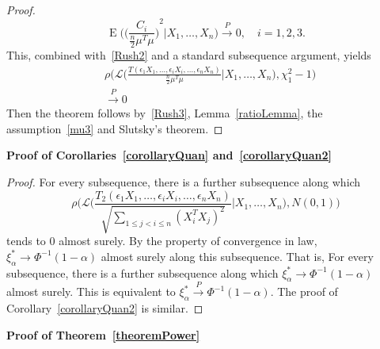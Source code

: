 \documentclass[review]{elsarticle}
\DeclareMathOperator{\myE}{E}
\theoremstyle{plain}
\theoremstyle{definition}
\theoremstyle{remark}
\begin{document}
\begin{proof}
    \begin{equation*}
    \myE\Big({\Big(\frac{C_i}{\frac{n}{2}\mu^T\mu}\Big)}^2\Big|X_1,\ldots,X_n\Big)\xrightarrow{P} 0,\quad i=1,2,3.
    \end{equation*}
    This, combined with~\eqref{Rush2} and a standard subsequence argument, yields
    \begin{equation}\label{Rush3}
        \begin{aligned}
            &\rho\Big(\mathcal{L}\Big(\frac{T(\epsilon_1 X_1,\ldots, \epsilon_i X_i,\ldots,\epsilon_n X_n)}{\frac{n}{2}\mu^T \mu}\Big| X_1,\ldots,X_n\Big),\chi^2_1-1\Big)\\
            &\xrightarrow{P} 0
        \end{aligned}
    \end{equation}
    Then the theorem follows by~\eqref{Rush3},  Lemma~\ref{ratioLemma}, the assumption~\eqref{mu3} and Slutsky's theorem.
\end{proof}

\textbf{\textbf{Proof of Corollaries~\ref{corollaryQuan} and~\ref{corollaryQuan2}}}

\begin{proof}
    For every subsequence, there is a further subsequence along which
    \begin{equation*}
        \rho\Big(\mathcal{L}\Big(\frac{T_2(\epsilon_1 X_1,\ldots, \epsilon_i X_i,\ldots,\epsilon_n X_n)}{\sqrt{\sum_{1\leq j<i\leq n}{(X_i^T X_j)}^2}}\Big|X_1,\ldots,X_n\Big),N(0,1)\Big)
    \end{equation*}
    tends to $0$ almost surely.
    By the property of convergence in law, $\xi^*_\alpha\to \Phi^{-1}(1-\alpha)$ almost surely along this subsequence.
    That is, For every subsequence, there is a further subsequence along which $\xi^*_\alpha\to \Phi^{-1}(1-\alpha)$ almost surely.
    This is equivalent to $\xi_{\alpha}^*  \xrightarrow{P}\Phi^{-1}(1-\alpha)$.
    The proof of Corollary~\ref{corollaryQuan2} is similar.

\end{proof}

\textbf{Proof of Theorem~\ref{theoremPower}}
\end{document}
